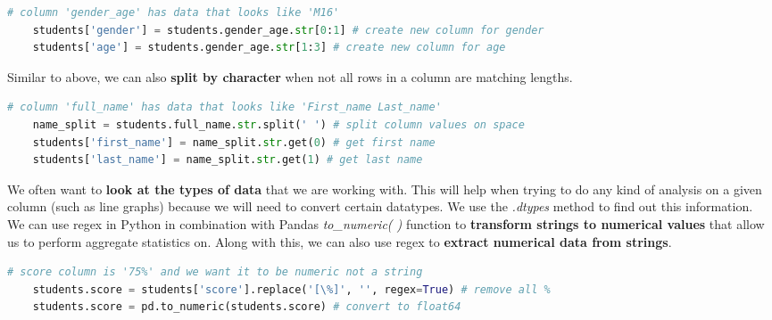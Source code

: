 \documentclass[11pt, a4paper]{article}
\begin{document}
\begin{spacing}{1.1}
	\begin{lstlisting}[language=Python]
	# column 'gender_age' has data that looks like 'M16'
	students['gender'] = students.gender_age.str[0:1] # create new column for gender
	students['age'] = students.gender_age.str[1:3] # create new column for age \end{lstlisting}\vspace*{1mm}
	Similar to above, we can also \textbf{split by character} when not all rows in a column are matching lengths.
	\begin{lstlisting}[language=Python]
	# column 'full_name' has data that looks like 'First_name Last_name'
	name_split = students.full_name.str.split(' ') # split column values on space
	students['first_name'] = name_split.str.get(0) # get first name
	students['last_name'] = name_split.str.get(1) # get last name \end{lstlisting} \newpage
	\noindent We often want to \textbf{look at the types of data} that we are working with. This will help when trying to do any kind of analysis on a given column (such as line graphs) because we will need to convert certain datatypes. We use the \textit{.dtypes} method to find out this information. \vspace*{1.5mm} \\
	We can use regex in Python in combination with Pandas \textit{to\_numeric( )} function to \textbf{transform strings to numerical values} that allow us to perform aggregate statistics on. Along with this, we can also use regex to \textbf{extract numerical data from strings}.
	\begin{lstlisting}[language=Python]
	# score column is '75%' and we want it to be numeric not a string
	students.score = students['score'].replace('[\%]', '', regex=True) # remove all %
	students.score = pd.to_numeric(students.score) # convert to float64	
	

\end{lstlisting}
\end{spacing}
\end{document}
